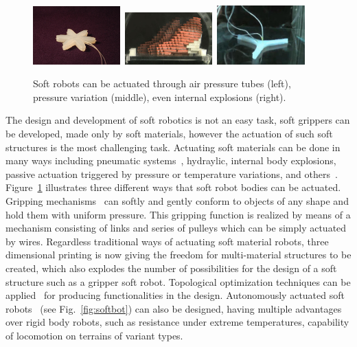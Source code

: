 \begin{figure}[t!]
\centering
\includegraphics[width=0.3\textwidth,height=0.13\textheight]{../Figures/Misc/soft_robotics_figure.png}\		
\includegraphics[width=0.3\textwidth,height=0.13\textheight]{../Figures/Misc/hillerPressureChamber.png}\	
\includegraphics[width=0.3\textwidth,height=0.13\textheight]{../Figures/Misc/ExplodingRobot.jpg}\\
\caption{Soft robots can be actuated through air pressure tubes (left), pressure variation (middle), even internal explosions (right).}
\label{fig:softRobotsActuation}
\end{figure}

The design and development of soft robotics is not an easy task, soft grippers can be developed, made only by soft materials, however the actuation of such soft structures is the most challenging task. Actuating soft materials can be done in many ways including pneumatic systems~\citep{ilievski2011soft, shepherd2011multigait}, hydraylic, internal body explosions, passive actuation triggered by pressure or temperature variations, and others~\citep{laschi2012soft, seok2010peristaltic}. Figure~\ref{fig:softRobotsActuation} illustrates three different ways that soft robot bodies can be actuated. Gripping mechanisms~\citep{hirose1978development} can softly and gently conform to objects of any shape and hold them with uniform pressure. This gripping function is realized by means of a mechanism consisting of links and series of pulleys which can be simply actuated by wires. Regardless traditional ways of actuating soft material robots, three dimensional printing is now giving the freedom for multi-material structures to be created, which also explodes the number of possibilities for the design of a soft structure such as a gripper soft robot. Topological optimization techniques can be applied~\citep{hiller2009multi} for producing functionalities in the design. Autonomously actuated soft robots~\citep{tolleyresilient} (see Fig.~\ref{fig:softbot}) can also be designed, having multiple advantages over rigid body robots, such as resistance under extreme temperatures, capability of locomotion on terrains of variant types. 


